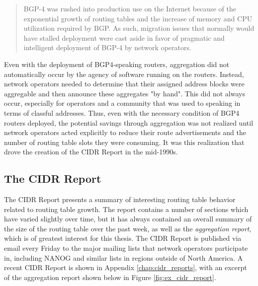 \begin{quote}
BGP-4 was rushed into production use on the Internet because of the exponential growth of routing tables and the increase of memory and CPU utilization required by BGP.  As such, migration issues that normally would have stalled deployment were cast aside in favor of pragmatic and intelligent deployment of BGP-4 by network operators.
\end{quote}

Even with the deployment of BGP4-speaking routers, aggregation did not automatically occur by the agency of software running on the routers. Instead, network operators needed to determine that their assigned address blocks were aggregable and then announce these aggregates "by hand". This did not always occur, especially for operators and a community that was used to speaking in terms of classful addresses. Thus, even with the necessary condition of BGP4 routers deployed, the potential savings through aggregation was not realized until network operators acted explicitly to reduce their route advertisements and the number of routing table slots they were consuming. It was this realization that drove the creation of the CIDR Report in the mid-1990s.

\subsection{The CIDR Report}

The CIDR Report presents a summary of interesting routing table behavior related to routing table growth. The report contains a number of sections which have varied slightly over time, but it has always contained an overall summary of the size of the routing table over the past week, as well as the \emph{aggregation report}, which is of greatest interest for this thesis. The CIDR Report is published via email every Friday to the major mailing lists that network operators participate in, including NANOG and similar lists in regions outside of North America. A recent CIDR Report is shown in Appendix \ref{chap:cidr_reports}, with an excerpt of the aggregation report shown below in Figure \ref{fig:ex_cidr_report}.

